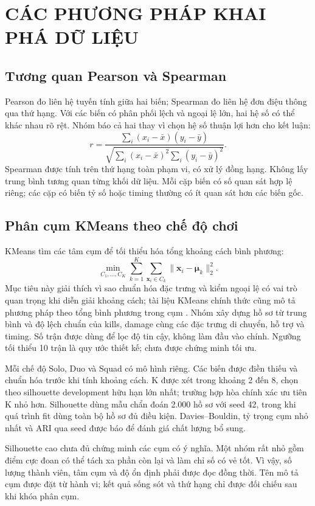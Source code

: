\documentclass[12pt,a4paper]{article}
\begin{document}
\section{CÁC PHƯƠNG PHÁP KHAI PHÁ DỮ LIỆU}
\subsection{Tương quan Pearson và Spearman}
Pearson đo liên hệ tuyến tính giữa hai biến; Spearman đo liên hệ đơn điệu thông qua thứ hạng. Với các biến có phân phối lệch và ngoại lệ lớn, hai hệ số có thể khác nhau rõ rệt. Nhóm báo cả hai thay vì chọn hệ số thuận lợi hơn cho kết luận:
\[
r=\frac{\sum_i(x_i-\bar x)(y_i-\bar y)}{\sqrt{\sum_i(x_i-\bar x)^2\sum_i(y_i-\bar y)^2}}.
\]
Spearman được tính trên thứ hạng toàn phạm vi, có xử lý đồng hạng. Không lấy trung bình tương quan từng khối dữ liệu. Mỗi cặp biến có số quan sát hợp lệ riêng; các cặp có biến tỷ số hoặc timing thường có ít quan sát hơn các biến gốc.
\subsection{Phân cụm KMeans theo chế độ chơi}
KMeans tìm các tâm cụm để tối thiểu hóa tổng khoảng cách bình phương:
\[
\min_{C_1,\ldots,C_K}\sum_{k=1}^{K}\sum_{\boldsymbol{x}_i\in C_k}\|\boldsymbol{x}_i-\boldsymbol{\mu}_k\|_2^2.
\]
Mục tiêu này giải thích vì sao chuẩn hóa đặc trưng và kiểm ngoại lệ có vai trò quan trọng khi diễn giải khoảng cách; tài liệu KMeans chính thức cũng mô tả phương pháp theo tổng bình phương trong cụm \cite{skcluster}.
Nhóm xây dựng hồ sơ từ trung bình và độ lệch chuẩn của kills, damage cùng các đặc trưng di chuyển, hỗ trợ và timing. Số trận được dùng để lọc độ tin cậy, không làm đầu vào chính. Ngưỡng tối thiểu 10 trận là quy ước thiết kế; chưa được chứng minh tối ưu.

Mỗi chế độ Solo, Duo và Squad có mô hình riêng. Các biến được điền thiếu và chuẩn hóa trước khi tính khoảng cách. K được xét trong khoảng 2 đến 8, chọn theo silhouette development hữu hạn lớn nhất; trường hợp hòa chính xác ưu tiên K nhỏ hơn. Silhouette dùng mẫu chẩn đoán 2.000 hồ sơ với seed 42, trong khi quá trình fit dùng toàn bộ hồ sơ đủ điều kiện. Davies--Bouldin, tỷ trọng cụm nhỏ nhất và ARI qua seed được báo để đánh giá chất lượng bổ sung.

Silhouette cao chưa đủ chứng minh các cụm có ý nghĩa. Một nhóm rất nhỏ gồm điểm cực đoan có thể tách xa phần còn lại và làm chỉ số có vẻ tốt. Vì vậy, số lượng thành viên, tâm cụm và độ ổn định phải được đọc đồng thời. Tên mô tả cụm được đặt từ hành vi; kết quả sống sót và thứ hạng chỉ được đối chiếu sau khi khóa phân cụm.
\end{document}
